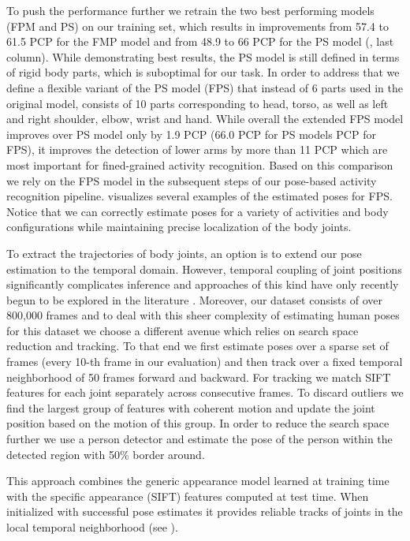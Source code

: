 To push the performance
further we retrain the two best performing models (FPM and PS) on our training
set, which results in improvements from 57.4 to 61.5 PCP for the FMP model and from 48.9 to 66 PCP for the PS model (, last column). While demonstrating best results, the PS model
is still defined in terms of rigid body parts, which is suboptimal for our
task. In order to address that we define a flexible variant of the PS model (FPS) that
instead of 6 parts used in the original model, consists of 10 parts
corresponding to head, torso, as well as left and right shoulder, elbow, wrist and
hand. While overall the extended FPS model improves over PS model only by 1.9 PCP
(66.0 PCP for PS models  PCP for FPS), it improves the detection of lower
arms by more than 11 PCP which are most important for fined-grained activity recognition. Based on  this
comparison we rely on the FPS model in the subsequent steps of our pose-based
activity recognition pipeline.  visualizes several examples
of the estimated poses for FPS. Notice that we can correctly estimate poses for a variety of
activities and body configurations while maintaining precise localization of the
body joints.  


To extract the trajectories of body joints, an option is to extend our
pose estimation to the temporal domain. However, temporal coupling of
joint positions significantly complicates inference and approaches of this kind
have only recently begun to be explored in the literature
\citep{Sapp:2011:PHM}. Moreover, our dataset consists of over 800,000 frames and to deal with this sheer complexity of
estimating human poses for this dataset we choose a different avenue which relies on search space reduction \citep{Ferrari:2008:PSS} and tracking. To that
end we first estimate poses over a sparse set of frames (every 10-th frame
in our evaluation) and then track over a fixed
temporal neighborhood of 50 frames forward and backward. For tracking we match SIFT features for each joint separately across consecutive frames. To discard outliers we find the largest
group of features with coherent motion and update the joint position based on
the motion of this group. In order to reduce the search space further we use a person detector \citep{Felzenszwalb2010PAMI} and estimate
the pose of the person within the detected region with 50\% border around.

This approach combines the generic appearance model learned at training time with the specific appearance (SIFT)
features computed at test time. When initialized with successful pose estimates
it provides reliable tracks of joints in the local temporal neighborhood
(see ). 

